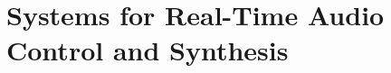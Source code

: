 \section{Systems for Real-Time Audio Control and Synthesis}\label{sec:real-time-audio-control-and-synthesis}



